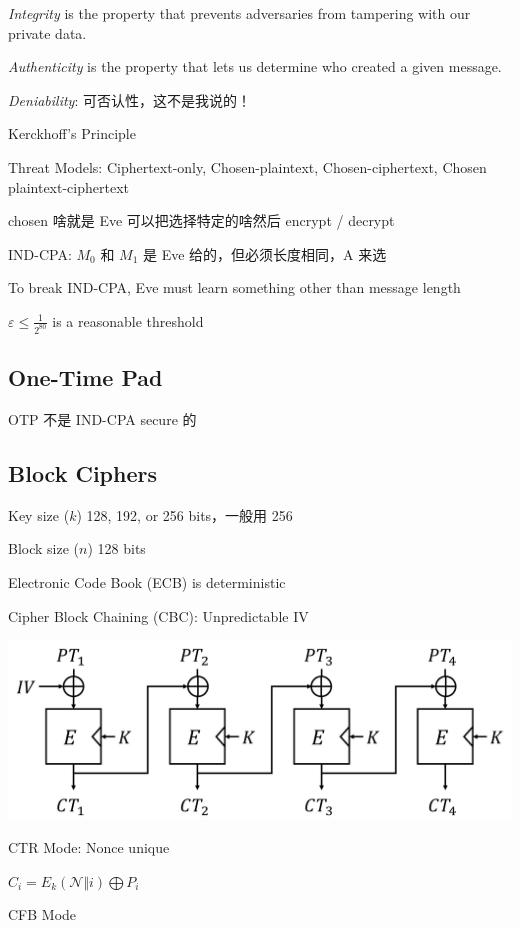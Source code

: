 \documentclass[9pt,landscape]{article}
\begin{document}
\begin{multicols}{2}
\textit{Integrity} is the property that prevents adversaries from tampering with our private data.

\textit{Authenticity} is the property that lets us determine who created a given message.

\textit{Deniability}: 可否认性，这不是我说的！

Kerckhoff's Principle

Threat Models: Ciphertext-only, Chosen-plaintext, Chosen-ciphertext, Chosen plaintext-ciphertext

chosen 啥就是 Eve 可以把选择特定的啥然后 encrypt / decrypt

IND-CPA: $M_0$ 和 $M_1$ 是 Eve 给的，但必须长度相同，A 来选

To break IND-CPA, Eve must learn something other than message length

$\varepsilon\le\frac{1}{2^{80}}$ is a reasonable threshold

\subsection{One-Time Pad}

OTP 不是 IND-CPA secure 的

\subsection{Block Ciphers}

Key size ($k$) 128, 192, or 256 bits，一般用 256

Block size ($n$) 128 bits

Electronic Code Book (ECB) is deterministic

Cipher Block Chaining (CBC): Unpredictable $\mathrm{IV}$

\includegraphics[width=\columnwidth]{imgs/CBC}

CTR Mode: Nonce unique

$C_i=E_k(\mathcal{N}\Vert i)\bigoplus P_i$

CFB Mode


\end{multicols}
\end{document}
